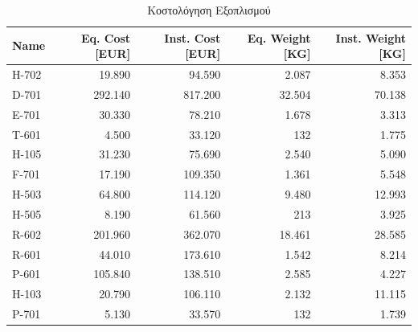 \documentclass[11pt]{article}
\begin{document}
\begin{table}[htbp]
\caption{Κοστολόγηση Εξοπλισμού}
\centering
\begin{tabular}{lrrrr}
Name & Eq. Cost [EUR] & Inst. Cost [EUR] & Eq. Weight [KG] & Inst. Weight [KG]\\
\hline
H-702 & 19.890 & 94.590 & 2.087 & 8.353\\
D-701 & 292.140 & 817.200 & 32.504 & 70.138\\
E-701 & 30.330 & 78.210 & 1.678 & 3.313\\
T-601 & 4.500 & 33.120 & 132 & 1.775\\
H-105 & 31.230 & 75.690 & 2.540 & 5.090\\
F-701 & 17.190 & 109.350 & 1.361 & 5.548\\
H-503 & 64.800 & 114.120 & 9.480 & 12.993\\
H-505 & 8.190 & 61.560 & 213 & 3.925\\
R-602 & 201.960 & 362.070 & 18.461 & 28.585\\
R-601 & 44.010 & 173.610 & 1.542 & 8.214\\
P-601 & 105.840 & 138.510 & 2.585 & 4.227\\
H-103 & 20.790 & 106.110 & 2.132 & 11.115\\
P-701 & 5.130 & 33.570 & 132 & 1.739\\
\end{tabular}
\end{table}
\end{document}
